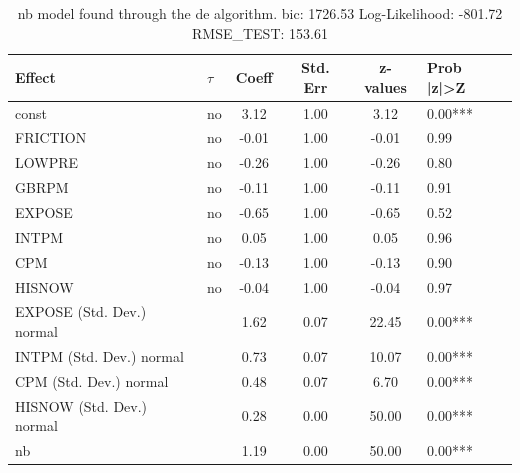 \begin{table}
	\caption{nb model found through the de algorithm. bic: 1726.53 Log-Likelihood: -801.72 RMSE_TEST: 153.61}
	\begin{center}
		\begin{tabular}{|l|l|c|c|c|l|}
			\hline
			Effect & $\tau$ & Coeff & Std. Err & z-values & Prob |z|>Z \\
			\hline
			const & no & 3.12 & 1.00 & 3.12 & 0.00*** \\
			\hline
			FRICTION & no & -0.01 & 1.00 & -0.01 & 0.99 \\
			\hline
			LOWPRE & no & -0.26 & 1.00 & -0.26 & 0.80 \\
			\hline
			GBRPM & no & -0.11 & 1.00 & -0.11 & 0.91 \\
			\hline
			EXPOSE & no & -0.65 & 1.00 & -0.65 & 0.52 \\
			\hline
			INTPM & no & 0.05 & 1.00 & 0.05 & 0.96 \\
			\hline
			CPM & no & -0.13 & 1.00 & -0.13 & 0.90 \\
			\hline
			HISNOW & no & -0.04 & 1.00 & -0.04 & 0.97 \\
			\hline
			EXPOSE (Std. Dev.) normal &  & 1.62 & 0.07 & 22.45 & 0.00*** \\
			\hline
			INTPM (Std. Dev.) normal &  & 0.73 & 0.07 & 10.07 & 0.00*** \\
			\hline
			CPM (Std. Dev.) normal &  & 0.48 & 0.07 & 6.70 & 0.00*** \\
			\hline
			HISNOW (Std. Dev.) normal &  & 0.28 & 0.00 & 50.00 & 0.00*** \\
			\hline
			nb &  & 1.19 & 0.00 & 50.00 & 0.00*** \\
			\hline
		\end{tabular}
	\end{center}
\end{table}